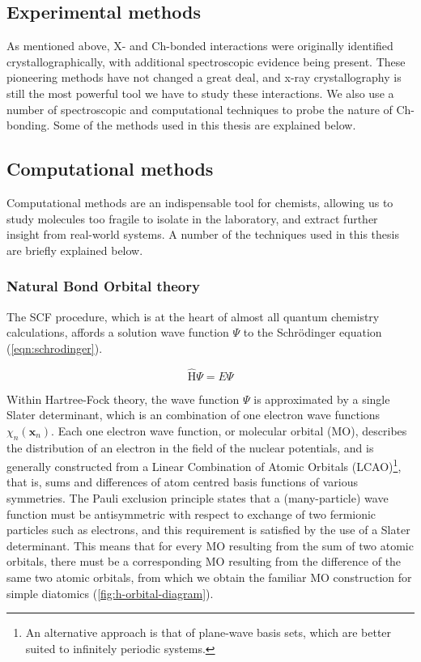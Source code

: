 \begin{refsection}

\chapter{Experimental methods}\label{ch:methods}
As mentioned above, X- and Ch-bonded interactions were originally identified crystallographically, with additional spectroscopic evidence being present.
These pioneering methods have not changed a great deal, and x-ray crystallography is still the most powerful tool we have to study these interactions.
We also use a number of spectroscopic and computational techniques to probe the nature of Ch-bonding.
Some of the methods used in this thesis are explained below.

\section{Computational methods}
Computational methods are an indispensable tool for chemists, allowing us to study molecules too fragile to isolate in the laboratory, and extract further insight from real-world systems.
A number of the techniques used in this thesis are briefly explained below.

\subsection{Natural Bond Orbital theory}
The SCF procedure, which is at the heart of almost all quantum chemistry calculations, affords a solution wave function $ \Psi $ to the Schr\"{o}dinger equation (\cref{eqn:schrodinger}).

\begin{equation}
    \hat{\mathrm{H}}\Psi = E\Psi
    \label{eqn:schrodinger}
\end{equation}

Within Hartree-Fock theory, the wave function $ \Psi $ is approximated by a single Slater determinant, which is an combination of one electron wave functions $\chi_{n}(\mathbf{x}_{n})$.
Each one electron wave function, or molecular orbital (MO), describes the distribution of an electron in the field of the nuclear potentials, and is generally constructed from a Linear Combination of Atomic Orbitals (LCAO)\footnote{An alternative approach is that of plane-wave basis sets, which are better suited to infinitely periodic systems.}, that is, sums and differences of atom centred basis functions of various symmetries.
The Pauli exclusion principle states that a (many-particle) wave function must be antisymmetric with respect to exchange of two fermionic particles such as electrons, and this requirement is satisfied by the use of a Slater determinant.
This means that for every MO resulting from the sum of two atomic orbitals, there must be a corresponding MO resulting from the difference of the same two atomic orbitals, from which we obtain the familiar MO construction for simple diatomics (\cref{fig:h-orbital-diagram}).


\end{refsection}
